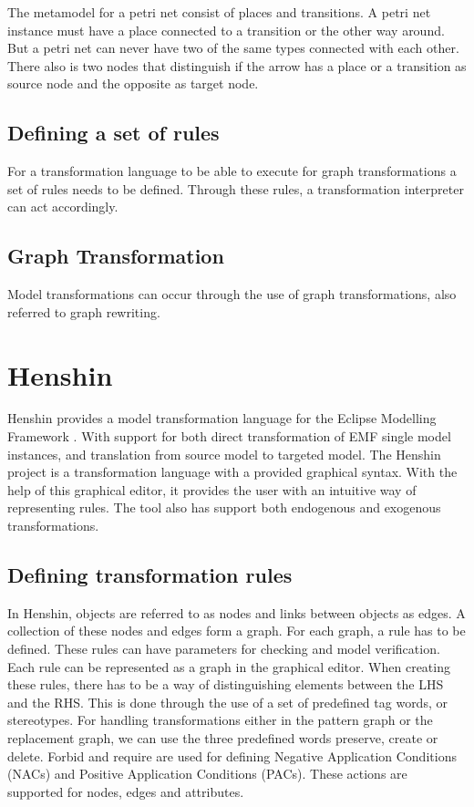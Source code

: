 \documentclass[pdftex,11pt,a4paper]{article}
\begin{document}
The metamodel for a petri net consist of places and transitions. A petri net
instance must have a place connected to a transition or the other way around.
But a petri net can never have two of the same types connected with each other.
There also is two nodes that distinguish if the arrow has a place or a
transition as source node and the opposite as target node.

\subsection{Defining a set of rules}
For a transformation language to be able to execute for graph transformations a
set of rules needs to be defined. Through these rules, a transformation
interpreter can act accordingly. 

\subsection{Graph Transformation}
Model transformations can occur through the use of graph transformations, also
referred to graph rewriting.

\section{Henshin}

Henshin provides a model transformation language for the Eclipse Modelling
Framework \cite{Steinberg2009}. With support for both direct 
transformation of EMF single model instances, and translation from source
model to targeted model. The Henshin project is a transformation language with a
provided graphical syntax. With the help of this graphical editor, it provides
the user with an intuitive way of representing rules. The tool also has support 
both endogenous and exogenous transformations.

\subsection{Defining transformation rules}

In Henshin, objects are referred to as nodes and links between objects as edges.
A collection of these nodes and edges form a graph. For each graph, a rule has
to be defined. These rules can have parameters for checking and model
verification. Each rule can be represented as a graph in the graphical
editor. \linebreak
\newline When creating these rules, there has to be a way of distinguishing
elements between the LHS and the RHS. This is done through the use of
a set of predefined tag words, or stereotypes. For handling transformations
either in the pattern graph or the replacement graph, we can use the three
predefined words preserve, create or delete. Forbid and require are used for
defining Negative Application Conditions (NACs) and Positive Application
Conditions (PACs). These actions are supported for nodes, edges and attributes.

\pagebreak
 

\end{document}
